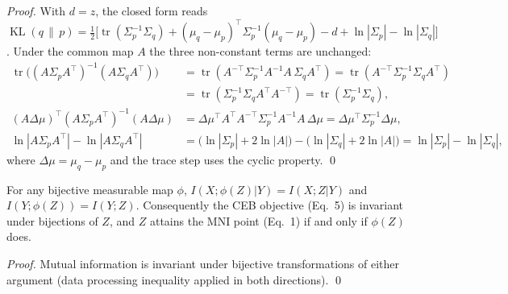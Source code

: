 \begin{proof}
With $d = z$, the closed form reads
$\operatorname{KL}(q\,\|\,p)
= \tfrac{1}{2}\big[\operatorname{tr}(\Sigma_p^{-1}\Sigma_q)
+ (\mu_q - \mu_p)^\top \Sigma_p^{-1}(\mu_q - \mu_p)
- d + \ln|\Sigma_p| - \ln|\Sigma_q|\big]$.
Under the common map $A$ the three non-constant terms are unchanged:
\begin{align*}
\operatorname{tr}\big((A\Sigma_p A^\top)^{-1}(A\Sigma_q A^\top)\big)
&= \operatorname{tr}(A^{-\top}\Sigma_p^{-1}A^{-1} A\,\Sigma_q A^\top)
 = \operatorname{tr}(A^{-\top}\Sigma_p^{-1}\Sigma_q A^\top) \\
&= \operatorname{tr}(\Sigma_p^{-1}\Sigma_q A^\top A^{-\top})
 = \operatorname{tr}(\Sigma_p^{-1}\Sigma_q), \\[2pt]
(A\Delta\mu)^\top (A\Sigma_p A^\top)^{-1} (A\Delta\mu)
&= \Delta\mu^\top A^\top A^{-\top}\Sigma_p^{-1}A^{-1}A\,\Delta\mu
 = \Delta\mu^\top \Sigma_p^{-1}\Delta\mu, \\[2pt]
\ln|A\Sigma_p A^\top| - \ln|A\Sigma_q A^\top|
&= \big(\ln|\Sigma_p| + 2\ln|A|\big) - \big(\ln|\Sigma_q| + 2\ln|A|\big)
 = \ln|\Sigma_p| - \ln|\Sigma_q|,
\end{align*}
where $\Delta\mu = \mu_q - \mu_p$ and the trace step uses the cyclic property. \hfill\qed
\end{proof}

\begin{lemma}\label{lem:mi-invariance}
For any bijective measurable map $\phi$,
$I(X;\phi(Z)|Y) = I(X;Z|Y)$ and $I(Y;\phi(Z)) = I(Y;Z)$.
Consequently the CEB objective (Eq.~5) is invariant under bijections of $Z$, and
$Z$ attains the MNI point (Eq.~1) if and only if $\phi(Z)$ does.
\end{lemma}

\begin{proof}
Mutual information is invariant under bijective transformations of either argument
(data processing inequality applied in both directions). \hfill\qed
\end{proof}

